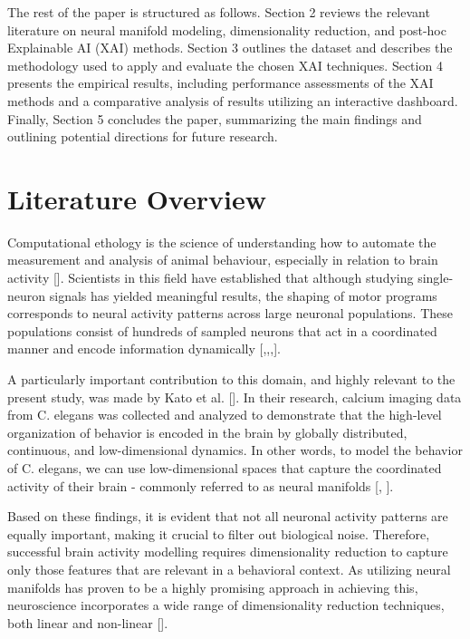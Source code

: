 \documentclass{article}
\begin{document}
The rest of the paper is structured as follows. Section 2 reviews the relevant literature on neural manifold modeling, dimensionality reduction, and post-hoc Explainable AI (XAI) methods. Section 3 outlines the dataset and describes the methodology used to apply and evaluate the chosen XAI techniques. Section 4 presents the empirical results, including performance assessments of the XAI methods and a comparative analysis of results utilizing an interactive dashboard. Finally, Section 5 concludes the paper, summarizing the main findings and outlining potential directions for future research.

\section{Literature Overview}

Computational ethology is the science of understanding how to automate the measurement and analysis of animal behaviour, especially in relation to brain activity [\cite{anderson2014toward}]. Scientists in this field have established that although studying single-neuron signals has yielded meaningful results, the shaping of motor programs corresponds to neural activity patterns across large neuronal populations. These populations consist of hundreds of sampled neurons that act in a coordinated manner and encode information dynamically [\cite{briggman2005optical},\cite{churchland2012neural},\cite{mante2013context},\cite{shenoy2013cortical}].

A particularly important contribution to this domain, and highly relevant to the present study, was made by Kato et al. [\cite{kato2015global}]. In their research, calcium imaging data from C. elegans was collected and analyzed to demonstrate that the high-level organization of behavior is encoded in the brain by globally distributed, continuous, and low-dimensional dynamics. In other words, to model the behavior of C. elegans, we can use low-dimensional spaces that capture the coordinated activity of their brain - commonly referred to as neural manifolds [\cite{churchland2012neural}, \cite{seung1996brain}]. 

Based on these findings, it is evident that not all neuronal activity patterns are equally important, making it crucial to filter out biological noise. Therefore, successful brain activity modelling requires dimensionality reduction to capture only those features that are relevant in a behavioral context. As utilizing neural manifolds has proven to be a highly promising approach in achieving this, neuroscience incorporates a wide range of dimensionality reduction techniques, both linear and non-linear [\cite{pang2016dimensionality}].
\end{document}
